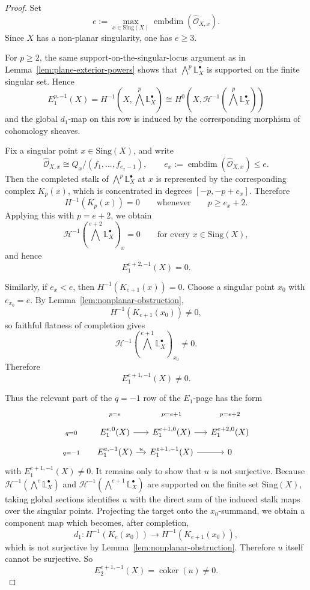 \documentclass[12pt,reqno]{amsart}
\begin{document}
\begin{proof}
Set
\[
\displaystyle
e:=\max_{x\in \mathrm{Sing}(X)} \operatorname{embdim}\!\left(\widehat{\mathcal O}_{X,x}\right).
\]
Since \(X\) has a non-planar singularity, one has \(e\ge 3\).

For \(p\ge 2\), the same support-on-the-singular-locus argument as in Lemma~\ref{lem:plane-exterior-powers} shows that \(\bigwedge^p\mathbb{L}^{\bullet}_X\) is supported on the finite singular set. Hence
\[
E_1^{p,-1}(X)
=
H^{-1}\!\left(X,\bigwedge^p\mathbb{L}^{\bullet}_X\right)
\cong
H^0\!\left(X,\mathcal H^{-1}\!\left(\bigwedge^p\mathbb{L}^{\bullet}_X\right)\right)
\]
and the global \(d_1\)-map on this row is induced by the corresponding morphism of cohomology sheaves.

Fix a singular point \(x\in \mathrm{Sing}(X)\), and write
\[
\widehat{\mathcal O}_{X,x}\cong Q_x/(f_1,\dots,f_{e_x-1}),
\qquad
e_x:=\operatorname{embdim}\!\left(\widehat{\mathcal O}_{X,x}\right)\le e.
\]
Then the completed stalk of \(\bigwedge^p\mathbb{L}^{\bullet}_X\) at \(x\) is represented by the corresponding complex \(K_p(x)\), which is concentrated in degrees \([-p,-p+e_x]\). Therefore
\[
H^{-1}\!\left(K_p(x)\right)=0
\qquad\text{whenever}\qquad
p\ge e_x+2.
\]
Applying this with \(p=e+2\), we obtain
\[
\mathcal H^{-1}\!\left(\bigwedge^{e+2}\mathbb{L}^{\bullet}_X\right)_x=0
\qquad\text{for every }x\in \mathrm{Sing}(X),
\]
and hence
\[
E_1^{e+2,-1}(X)=0.
\]

Similarly, if \(e_x<e\), then \(H^{-1}(K_{e+1}(x))=0\). Choose a singular point \(x_0\) with \(e_{x_0}=e\). By Lemma~\ref{lem:nonplanar-obstruction},
\[
H^{-1}\!\left(K_{e+1}(x_0)\right)\neq 0,
\]
so faithful flatness of completion gives
\[
\mathcal H^{-1}\!\left(\bigwedge^{e+1}\mathbb{L}^{\bullet}_X\right)_{x_0}\neq 0.
\]
Therefore
\[
E_1^{e+1,-1}(X)\neq 0.
\]

Thus the relevant part of the \(q=-1\) row of the \(E_1\)-page has the form
\[
\begin{tikzcd}[row sep=tiny, column sep=small]
& \scriptstyle p=e & \scriptstyle p=e+1 & \scriptstyle p=e+2 \\
\scriptstyle q=0
& E_1^{e,0}(X) \ar[r]
& E_1^{e+1,0}(X) \ar[r]
& E_1^{e+2,0}(X)
\\
\scriptstyle q=-1
& E_1^{e,-1}(X) \ar[r,"u"]
& E_1^{e+1,-1}(X) \ar[r]
& 0
\end{tikzcd}
\]
with \(E_1^{e+1,-1}(X)\neq 0\). It remains only to show that
\(u\) is not surjective.
Because \(\mathcal H^{-1}(\bigwedge^e\mathbb{L}^{\bullet}_X)\) and \(\mathcal H^{-1}(\bigwedge^{e+1}\mathbb{L}^{\bullet}_X)\) are supported on the finite set \(\mathrm{Sing}(X)\), taking global sections identifies \(u\) with the direct sum of the induced stalk maps over the singular points. Projecting the target onto the \(x_0\)-summand, we obtain a component map which becomes, after completion,
\[
d_1:H^{-1}\!\left(K_e(x_0)\right)\longrightarrow H^{-1}\!\left(K_{e+1}(x_0)\right),
\]
which is not surjective by Lemma~\ref{lem:nonplanar-obstruction}. Therefore \(u\) itself cannot be surjective. So
\[
E_2^{e+1,-1}(X)
=
\operatorname{coker}(u)\neq 0.
\]


\end{proof}
\end{document}
